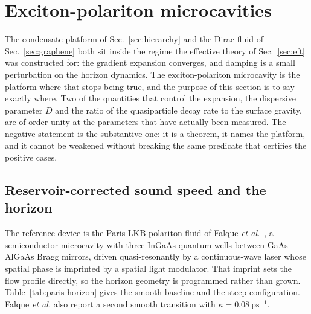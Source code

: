 \documentclass[aps,prd,reprint,nofootinbib,superscriptaddress]{revtex4-2}
\begin{document}
\section{Exciton-polariton microcavities}
\label{sec:polariton}

The condensate platform of Sec.~\ref{sec:hierarchy} and the Dirac fluid
of Sec.~\ref{sec:graphene} both sit inside the regime the effective
theory of Sec.~\ref{sec:eft} was constructed for: the gradient expansion
converges, and damping is a small perturbation on the horizon dynamics.
The exciton-polariton microcavity is the platform where that stops being
true, and the purpose of this section is to say exactly where. Two of
the quantities that control the expansion, the dispersive parameter $D$
and the ratio of the quasiparticle decay rate to the surface gravity,
are of order unity at the parameters that have actually been measured.
The negative statement is the substantive one: it is a theorem, it names
the platform, and it cannot be weakened without breaking the same
predicate that certifies the positive cases.

\subsection{Reservoir-corrected sound speed and the horizon}
\label{sec:pol-cs}

The reference device is the Paris-LKB polariton fluid of Falque
\emph{et al.}~\cite{Falque2025}, a semiconductor microcavity with three
InGaAs quantum wells between GaAs-AlGaAs Bragg mirrors, driven
quasi-resonantly by a continuous-wave laser whose spatial phase is
imprinted by a spatial light modulator. That imprint sets the flow
profile directly, so the horizon geometry is programmed rather than
grown. Table~\ref{tab:paris-horizon} gives the smooth baseline and the
steep configuration. Falque \emph{et al.} also report a second smooth
transition with $\kappa = 0.08~\mathrm{ps}^{-1}$.

\begin{table}[t]
\centering

\caption{Paris-LKB horizon inputs from Falque \emph{et al.}~\cite{Falque2025}.
Sound speed and upstream healing length refer to the smooth profile.
The steep column reports the separate gradient.}
\label{tab:paris-horizon}
\end{table}
\end{document}
